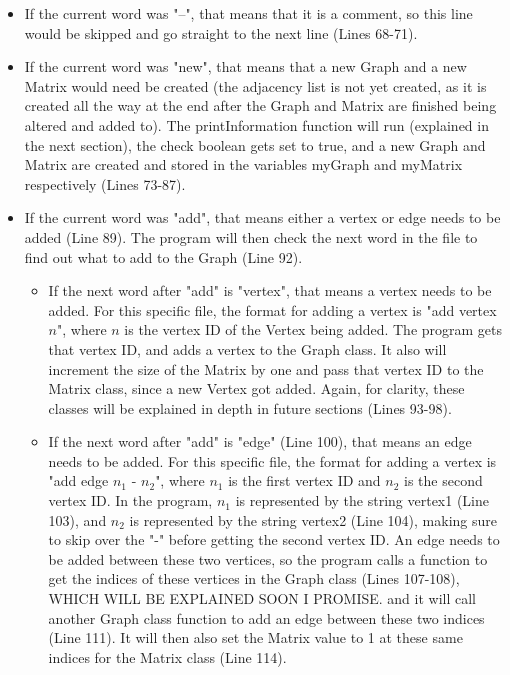 \documentclass[letterpaper, 10pt]{article}
\begin{document}
\begin{itemize}
    \item If the current word was "--", that means that it is a comment, so this line would be skipped and go straight to the next line (Lines 68-71).
    \item If the current word was "new", that means that a new Graph and a new Matrix would need be created (the adjacency list is not yet created, as it is created all the way at the end after the Graph and Matrix are finished being altered and added to). The printInformation function will run (explained in the next section), the check boolean gets set to true, and a new Graph and Matrix are created and stored in the variables myGraph and myMatrix respectively (Lines 73-87).
    \item If the current word was "add", that means either a vertex or edge needs to be added (Line 89). The program will then check the next word in the file to find out what to add to the Graph (Line 92).
    \begin{itemize}
        \item If the next word after "add" is "vertex", that means a vertex needs to be added. For this specific file, the format for adding a vertex is "add vertex $n$", where $n$ is the vertex ID of the Vertex being added. The program gets that vertex ID, and adds a vertex to the Graph class. It also will increment the size of the Matrix by one and pass that vertex ID to the Matrix class, since a new Vertex got added. Again, for clarity, these classes will be explained in depth in future sections (Lines 93-98).
        \item If the next word after "add" is "edge" (Line 100), that means an edge needs to be added. For this specific file, the format for adding a vertex is "add edge $n_1$ - $n_2$", where $n_1$ is the first vertex ID and $n_2$ is the second vertex ID. In the program, $n_1$ is represented by the string vertex1 (Line 103), and $n_2$ is represented by the string vertex2 (Line 104), making sure to skip over the "-" before getting the second vertex ID. An edge needs to be added between these two vertices, so the program calls a function to get the indices of these vertices in the Graph class (Lines 107-108), WHICH WILL BE EXPLAINED SOON I PROMISE. and it will call another Graph class function to add an edge between these two indices (Line 111). It will then also set the Matrix value to 1 at these same indices for the Matrix class (Line 114). 
    \end{itemize}
\end{itemize}
\end{document}
